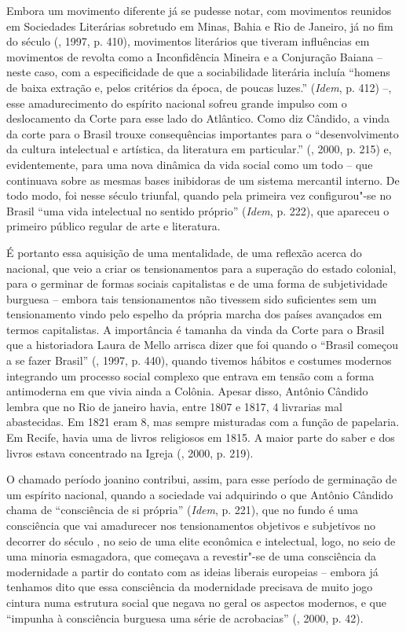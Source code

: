 Embora um movimento diferente já se pudesse notar, com movimentos
reunidos em Sociedades Literárias sobretudo em Minas, Bahia e Rio de
Janeiro, já no fim do século  (, 1997, p. 410), movimentos
literários que tiveram influências em movimentos de revolta como a
Inconfidência Mineira e a Conjuração Baiana -- neste caso, com a
especificidade de que a sociabilidade literária incluía ``homens de
baixa extração e, pelos critérios da época, de poucas luzes.''
(\emph{Idem}, p. 412) --, esse amadurecimento do espírito nacional
sofreu grande impulso com o deslocamento da Corte para esse lado do
Atlântico. Como diz Cândido, a vinda da corte para o Brasil trouxe
consequências importantes para o ``desenvolvimento da cultura
intelectual e artística, da literatura em particular.'' (, 2000,
p. 215) e, evidentemente, para uma nova dinâmica da vida social como um
todo -- que continuava sobre as mesmas bases inibidoras de um sistema
mercantil interno. De todo modo, foi nesse século triunfal, quando pela
primeira vez configurou"-se no Brasil ``uma vida intelectual no sentido
próprio'' (\emph{Idem}, p. 222), que apareceu o primeiro público regular
de arte e literatura.

É portanto essa aquisição de uma mentalidade, de uma reflexão acerca do
nacional, que veio a criar os tensionamentos para a superação do estado
colonial, para o germinar de formas sociais capitalistas e de uma forma
de subjetividade burguesa -- embora tais tensionamentos não tivessem
sido suficientes sem um tensionamento vindo pelo espelho da própria
marcha dos países avançados em termos capitalistas. A importância é
tamanha da vinda da Corte para o Brasil que a historiadora Laura de
Mello arrisca dizer que foi quando o ``Brasil começou a se fazer
Brasil'' (, 1997, p. 440), quando tivemos hábitos e costumes
modernos integrando um processo social complexo que entrava em tensão
com a forma antimoderna em que vivia ainda a Colônia. Apesar disso, Antônio Cândido
lembra que no Rio de janeiro havia, entre 1807 e 1817, 4 livrarias mal
abastecidas. Em 1821 eram 8, mas sempre misturadas com a função de
papelaria. Em Recife, havia uma de livros religiosos em 1815. A maior
parte do saber e dos livros estava concentrado na Igreja (, 2000,
p. 219).

O chamado período joanino contribui, assim, para esse período de
germinação de um espírito nacional, quando a sociedade vai adquirindo o
que Antônio Cândido chama de ``consciência de si própria'' (\emph{Idem},
p. 221), que no fundo é uma consciência que vai amadurecer nos
tensionamentos objetivos e subjetivos no decorrer do século , no seio
de uma elite econômica e intelectual, logo, no seio de uma minoria
esmagadora, que começava a revestir"-se de uma consciência da modernidade
a partir do contato com as ideias liberais europeias -- embora já
tenhamos dito que essa consciência da modernidade precisava de muito
jogo cintura numa estrutura social que negava no geral os aspectos
modernos, e que ``impunha à consciência burguesa uma série de
acrobacias'' (, 2000, p. 42).


